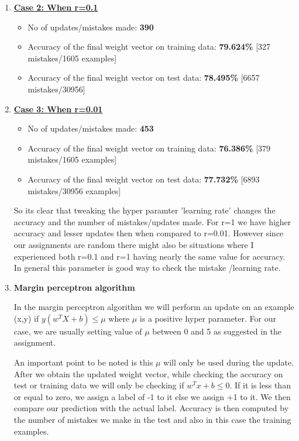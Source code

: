 \documentclass[12pt, fullpage,letterpaper]{article}
\begin{document}
\begin{enumerate}
		\item[] \textbf {\underline{ Case 2: When r=0.1}}
		\begin{itemize}
			\item No of updates/mistakes made: \textbf{390} 
			\item Accuracy of the final weight vector on training data: \textbf{79.624\%} [327 mistakes/1605 examples]
			\item Accuracy of the final weight vector on test data: \textbf{78.495\%} [6657 mistakes/30956]
		\end{itemize}
		
		\item[] \textbf {\underline{ Case 3: When r=0.01}}
		\begin{itemize}
			\item No of updates/mistakes made: \textbf{453} 
			\item Accuracy of the final weight vector on training data: \textbf{76.386\%} [379 mistakes/1605 examples]
			\item Accuracy of the final weight vector on test data: \textbf{77.732\%} [6893 mistakes/30956 examples]
		\end{itemize}
		
		So its clear that tweaking the hyper paramter 'learning rate'  changes the accuracy and the number of mistakes/updates made. For r=1 we have higher accuracy and lesser updates then when compared to r=0.01. However since our assignments are random there might also be situations where I experienced both r=0.1 and r=1 having nearly the same value for accuracy. In general this parameter is good way to check the mistake /learning rate.
		
		
		\item[] \textbf{Margin perceptron algorithm }
		
		In the margin perceptron algorithm we will perform an update on an example (x,y) if $y(w^T X +b) \leq \mu $ where $\mu$ is a positive hyper parameter. For our case, we are usually setting value of $\mu$ between 0 and 5 as suggested in the assignment.  
		
		An important point to be noted is this $\mu$ will only be used during the update. After we obtain the updated weight vector, while checking the accuracy on test or training data we will only be checking if $w^T x +b \leq 0$. If it is less than or equal to zero, we assign a label of -1 to it else we assign +1 to it. We then compare our prediction with the actual label. Accuracy is then computed by the number of mistakes we make in the test and also in this case the training examples.
		

\end{enumerate}
\end{document}
